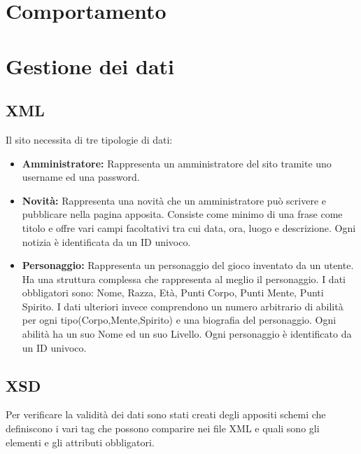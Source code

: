\documentclass{article}
\begin{document}
 \newpage


\section{Comportamento}


 \newpage
\section{Gestione dei dati}
	\subsection{XML}
		Il sito necessita di tre tipologie di dati:
		\begin{itemize}
			\item \textbf{Amministratore: } Rappresenta un amministratore del sito tramite uno username ed una password.
			\item \textbf{Novità: } Rappresenta una novità che un amministratore può scrivere e pubblicare nella pagina apposita.
				Consiste come minimo di una frase come titolo e offre vari campi facoltativi tra cui data, ora, luogo e
				descrizione. Ogni notizia è identificata da un ID univoco.
			\item \textbf{Personaggio: } Rappresenta un personaggio del gioco inventato da un utente. Ha una struttura complessa 
				che rappresenta al meglio il personaggio. I dati obbligatori sono: Nome, Razza, Età, Punti Corpo, Punti Mente, 
				Punti Spirito. I dati ulteriori invece comprendono un numero arbitrario di abilità per ogni 
				tipo(Corpo,Mente,Spirito) e una biografia del personaggio. Ogni abilità ha un suo Nome ed un suo Livello.
				Ogni personaggio è identificato da un ID univoco.
	\end{itemize}
	
	\subsection{XSD}
		Per verificare la validità dei dati sono stati creati degli appositi schemi che definiscono i vari tag che possono
		comparire nei file XML e quali sono gli elementi e gli attributi obbligatori.
		
\end{document}

